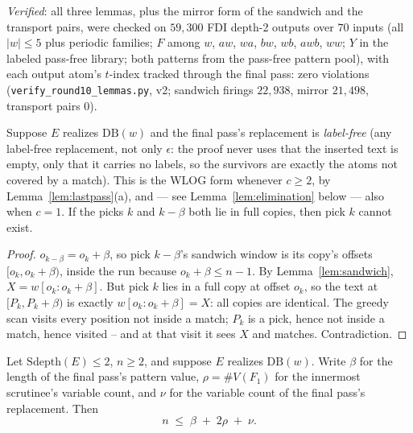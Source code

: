 \noindent \emph{Verified}: all three lemmas, plus the mirror form of
the sandwich and the transport pairs, were checked on $59{,}300$ FDI
depth-2 outputs over $70$ inputs (all $|w| \leq 5$ plus periodic
families; $F$ among $w$, $aw$, $wa$, $bw$, $wb$, $awb$, $ww$; $Y$ in
the labeled pass-free library; both patterns from the pass-free
pattern pool), with each output atom's $t$-index tracked through the
final pass: zero violations
(\texttt{verify\_round10\_lemmas.py}, v2; sandwich firings
$22{,}938$, mirror $21{,}498$, transport pairs $0$).

\begin{lemma}[transport]
    \label{lem:transport}
    Suppose $E$ realizes $\mathrm{DB}(w)$ and the final pass's
    replacement is \emph{label-free} (any label-free replacement, not
    only $\epsilon$: the proof never uses that the inserted text is
    empty, only that it carries no labels, so the survivors are exactly
    the atoms not covered by a match).  This is the WLOG form whenever
    $c \geq 2$, by Lemma~\ref{lem:lastpass}(a), and — see
    Lemma~\ref{lem:elimination} below — also when $c = 1$.  If the
    picks $k$ and $k - \beta$ both lie in full copies, then pick $k$
    cannot exist.
\end{lemma}

\begin{proof}
    $o_{k-\beta} = o_k + \beta$, so pick $k{-}\beta$'s sandwich
    window is its copy's offsets $[o_k, o_k + \beta)$, inside the run
    because $o_k + \beta \leq n - 1$.  By
    Lemma~\ref{lem:sandwich}, $X = w[o_k : o_k+\beta]$.  But pick $k$
    lies in a full copy at offset $o_k$, so the text at $[P_k, P_k +
    \beta)$ is exactly $w[o_k : o_k+\beta] = X$: all copies are
    identical.  The greedy scan visits every position not inside a
    match; $P_k$ is a pick, hence not inside a match, hence visited --
    and at that visit it sees $X$ and matches.  Contradiction.
\end{proof}

\begin{theorem}
    \label{thm:depth2}
    Let $\mathrm{Sdepth}(E) \leq 2$, $n \geq 2$, and suppose $E$
    realizes $\mathrm{DB}(w)$.  Write $\beta$ for the length of the
    final pass's pattern value, $\rho = \#V(F_1)$ for the innermost
    scrutinee's variable count, and $\nu$ for the variable count of
    the final pass's replacement.  Then
    \[
    n \;\leq\; \beta \;+\; 2\rho \;+\; \nu .
    \]
\end{theorem}

